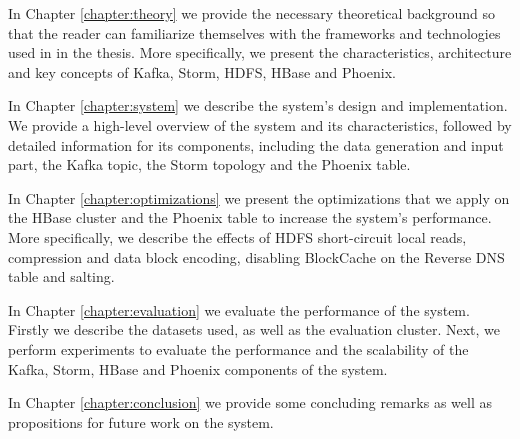 In Chapter \ref{chapter:theory} we provide the necessary theoretical background so that the reader can familiarize themselves with the frameworks and technologies used in in the thesis. More specifically, we present the characteristics, architecture and key concepts of Kafka, Storm, HDFS, HBase and Phoenix.

In Chapter \ref{chapter:system} we describe the system's design and implementation. We provide a high-level overview of the system and its characteristics, followed by detailed information for its components, including the data generation and input part, the Kafka topic, the Storm topology and the Phoenix table.

In Chapter \ref{chapter:optimizations} we present the optimizations that we apply on the HBase cluster and the Phoenix table to increase the system's performance. More specifically, we describe the effects of HDFS short-circuit local reads, compression and data block encoding, disabling BlockCache on the Reverse DNS table and salting.

In Chapter \ref{chapter:evaluation} we evaluate the performance of the system. Firstly we describe the datasets used, as well as the evaluation cluster. Next, we perform experiments to evaluate the performance and the scalability of the Kafka, Storm, HBase and Phoenix components of the system.

In Chapter \ref{chapter:conclusion} we provide some concluding remarks as well as propositions for future work on the system.


\cleardoublepage
